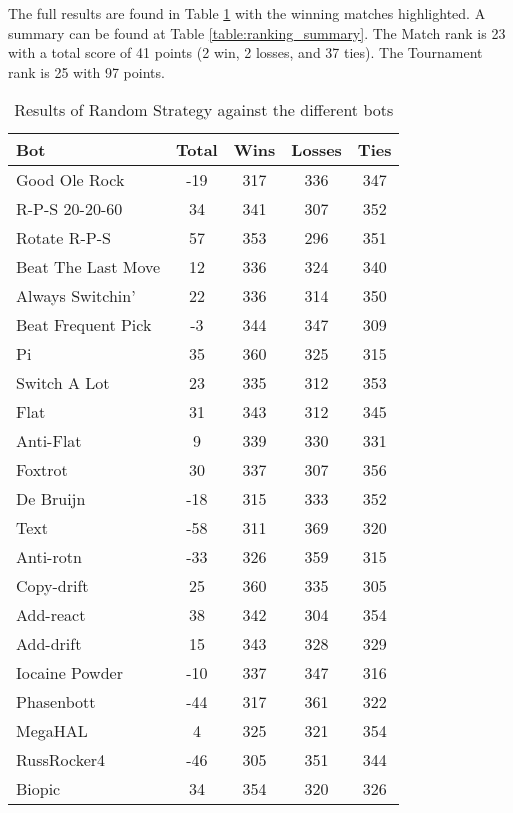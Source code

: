 The full results are found in Table \ref{table:RandomStrategyOnly_results} with the winning matches highlighted. A summary can be found at Table \ref{table:ranking_summary}. The Match rank is 23 with a total score of 41 points (2 win, 2 losses, and 37 ties). The Tournament rank is 25 with 97 points.

\begin{table}
    \caption{Results of Random Strategy against the different bots}
    \label{table:RandomStrategyOnly_results}
    \centering
    \begin{tabular}{|l|c|c|c|c|}
        \hline
        \textbf{Bot} & \textbf{Total} & \textbf{Wins} & \textbf{Losses} & \textbf{Ties} \\ \hline
Good Ole Rock & -19 & 317 & 336 & 347 \\ \hline 
R-P-S 20-20-60 & 34 & 341 & 307 & 352 \\ \hline 
\rowcolor{HighlightRowColor} Rotate R-P-S & 57 & 353 & 296 & 351 \\ \hline 
Beat The Last Move & 12 & 336 & 324 & 340 \\ \hline 
Always Switchin' & 22 & 336 & 314 & 350 \\ \hline 
Beat Frequent Pick & -3 & 344 & 347 & 309 \\ \hline 
Pi & 35 & 360 & 325 & 315 \\ \hline 
Switch A Lot & 23 & 335 & 312 & 353 \\ \hline 
Flat & 31 & 343 & 312 & 345 \\ \hline 
Anti-Flat & 9 & 339 & 330 & 331 \\ \hline 
Foxtrot & 30 & 337 & 307 & 356 \\ \hline 
De Bruijn & -18 & 315 & 333 & 352 \\ \hline 
Text & -58 & 311 & 369 & 320 \\ \hline 
Anti-rotn & -33 & 326 & 359 & 315 \\ \hline 
Copy-drift & 25 & 360 & 335 & 305 \\ \hline 
Add-react & 38 & 342 & 304 & 354 \\ \hline 
Add-drift & 15 & 343 & 328 & 329 \\ \hline 
Iocaine Powder & -10 & 337 & 347 & 316 \\ \hline 
Phasenbott & -44 & 317 & 361 & 322 \\ \hline 
MegaHAL & 4 & 325 & 321 & 354 \\ \hline 
RussRocker4 & -46 & 305 & 351 & 344 \\ \hline 
Biopic & 34 & 354 & 320 & 326 \\ \hline 

\end{tabular}
\end{table}
